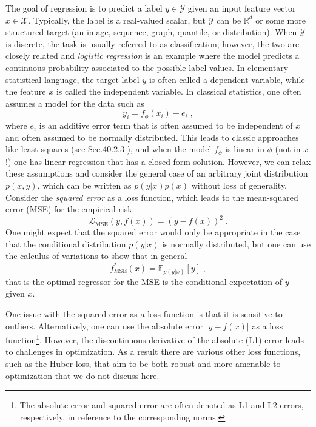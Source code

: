 The goal of regression is to predict a label $y\in \mathcal{Y}$ given an input feature vector $x \in \mathcal{X}$. Typically, the label is a real-valued scalar, but $\mathcal{Y}$ can be $\mathbb{R}^d$ or some more structured target (\eg an image, sequence, graph, quantile, or distribution). When $\mathcal{Y}$ is discrete, the task is usually referred to as classification; however, the two are closely related and \textit{logistic regression} is an example where the model predicts a continuous probability associated to the possible label values. 
In elementary statistical language, the target label $y$ is often called a dependent variable, while the feature $x$ is called the independent variable. In classical statistics, one often assumes a model for the data such as 
\begin{equation}
    \label{ML:eq:classical_regression}
    y_i = f_\phi(x_i) + e_i \;,
\end{equation}
where $e_i$ is an additive error term that is often assumed to be independent of $x$ and often assumed to be normally distributed. This leads to classic approaches like least-squares (see Sec.40.2.3 ), and when the model $f_\phi$ is linear in $\phi$ (not in $x$!) one has linear regression that has a closed-form solution. However, we can relax these assumptions and consider the general case of an arbitrary joint distribution $p(x,y)$, which can be written as $p(y|x)p(x)$ without loss of generality. Consider the \textit{squared error} as a loss function, which leads to the mean-squared error (MSE) for the empirical risk:
\begin{equation}
    \label{ML:eq:squared-error}
    \mathcal{L}_\textrm{MSE}(y, f(x)) = (y - f(x))^2 \;.
\end{equation}
One might expect that the squared error would only be appropriate in the case that the conditional distribution $p(y|x)$ is normally distributed, but one can use the calculus of variations to show that in general 
\begin{equation}
    \label{ML:eq:fstar_MSE}
    f^*_\textrm{MSE}(x) = \mathbb{E}_{p(y|x)} [y] \;,
\end{equation}
that is the optimal regressor for the MSE is the conditional expectation of $y$ given $x$. 

One issue with the squared-error as a loss function is that it is sensitive to outliers. Alternatively, one can use the absolute error $|y - f(x)|$ as a loss function\footnote{The absolute error and squared error are often denoted as L1 and L2 errors, respectively, in reference to the corresponding norms.}. However, the discontinuous derivative of the  absolute (L1) error leads to challenges in optimization. As a result there are various other loss functions, such as the Huber loss, that aim to be both robust and more amenable to optimization that we do not discuss here. 


